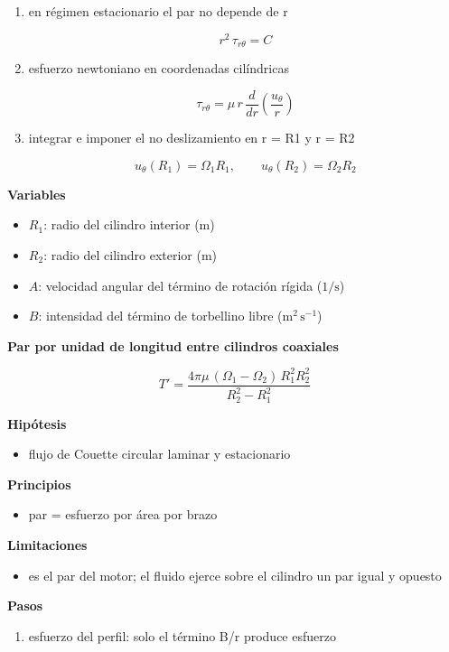 \documentclass[10pt,openany]{book}
\begin{document}
\begin{tcolorbox}[title={Desarrollos del modelo}, studiumdef, breakable]
\begin{enumerate}
\[
T'(r) = 2\pi r^{2}\,\tau_{r\theta}(r)
\]
\item
en régimen estacionario el par no depende de r

\[
r^{2}\,\tau_{r\theta} = C
\]
\item
esfuerzo newtoniano en coordenadas cilíndricas

\[
\tau_{r\theta} = \mu\, r\,\frac{d}{dr}\!\left(\frac{u_\theta}{r}\right)
\]
\item
integrar e imponer el no deslizamiento en r = R1 y r = R2

\[
u_\theta(R_1) = \Omega_1 R_1,\qquad u_\theta(R_2) = \Omega_2 R_2
\]
\end{enumerate}

\noindent\textbf{Variables}
\begin{itemize}
\item $R_{1}$: radio del cilindro interior ($\mathrm{m}$)
\item $R_{2}$: radio del cilindro exterior ($\mathrm{m}$)
\item $A$: velocidad angular del término de rotación rígida ($\mathrm{1/s}$)
\item $B$: intensidad del término de torbellino libre ($\mathrm{m}^{2}\,\mathrm{s}^{-1}$)
\end{itemize}



\noindent\textbf{Par por unidad de longitud entre cilindros coaxiales}

\[
T' = \frac{4\pi\mu\,(\Omega_1 - \Omega_2)\,R_1^{2} R_2^{2}}{R_2^{2} - R_1^{2}}
\]

\noindent\textbf{Hipótesis}
\begin{itemize}
\item flujo de Couette circular laminar y estacionario
\end{itemize}

\noindent\textbf{Principios}
\begin{itemize}
\item par = esfuerzo por área por brazo
\end{itemize}

\noindent\textbf{Limitaciones}
\begin{itemize}
\item es el par del motor; el fluido ejerce sobre el cilindro un par igual y opuesto
\end{itemize}

\noindent\textbf{Pasos}
\begin{enumerate}
\item
esfuerzo del perfil: solo el término B/r produce esfuerzo


\end{enumerate}
\end{tcolorbox}
\end{document}
